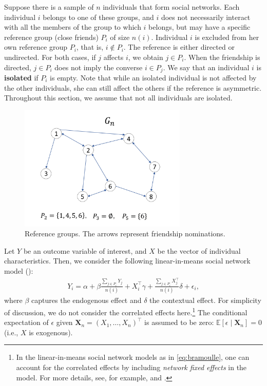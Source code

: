 \documentclass[10.5pt, A4paper, openany, uplatex]{book}
\newcommand{\E}{\mathbb{E}}
\numberwithin{equation}{section}
\begin{document}
Suppose there is a sample of $n$ individuals that form social networks.
Each individual $i$ belongs to one of these  groups, and $i$ does not necessarily interact with all the members of the group to which $i$ belongs, but may have a specific reference group (close friends) $P_i$ of size $n(i)$. 
Individual $i$ is excluded from her own reference group $P_i$, that is, $ i \not\in P_i$.
The reference is either directed  or undirected. 
For both cases, if $j$ affects $i$, we obtain $j \in P_i$.
When the friendship is directed, $j \in P_i$ does not imply the converse $i \in P_j $.
We say that an individual $i$ is \textbf{isolated} if $P_i$ is empty. 
Note that while an isolated individual is not affected by the other individuals, she can still affect the others if the reference is asymmetric.
Throughout this section, we assume that not all individuals are isolated. 

\begin{figure}[h!]
	\begin{center}
	\includegraphics[width = 8cm]{reference.png}
	\caption{Reference groups. The arrows represent friendship nominations.}
	\end{center}
\end{figure}

Let $Y$ be an outcome variable of interest, and $X$ be the vector of individual characteristics. Then, we consider the following linear-in-means social network model (\cite{bramoulle2009identification}):
\begin{align}\label{eq:bramoulle}
	Y_i = \alpha + \beta \frac{\sum_{j \in P_i} Y_j}{n(i)} + X_i^\top \gamma +  \frac{\sum_{j \in P_i} X_j^\top}{n(i)} \delta + \epsilon_i, 
\end{align}
where $\beta$ captures the endogenous effect and $\delta$ the contextual effect.
For simplicity of discussion, we do not consider the correlated effects here.\footnote{
	In the linear-in-means social network models as in \eqref{eq:bramoulle}, one can account for the correlated effects by including  \textit{network fixed effects} in the model.
	For more details, see, for example, \cite{lee2007identification} and \cite{bramoulle2009identification}.
	}
The conditional expectation of $\epsilon$ given $\mathbf{X}_n = (X_1, \ldots, X_n)^\top$ is assumed to be zero: $\E[\epsilon \mid \mathbf{X}_n] = 0$ (i.e., $X$ is exogenous).
\end{document}
